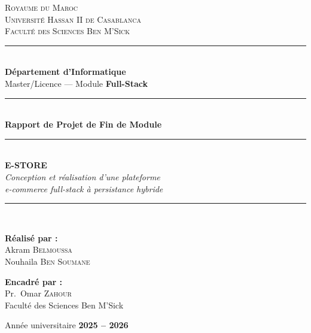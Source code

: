 \documentclass[11pt,a4paper,oneside]{report}
\begin{document}
\begin{titlepage}
  \begin{center}

  \vspace*{1cm}
  {\large\textsc{Royaume du Maroc}}\\[0.2cm]
  {\large\textsc{Université Hassan II de Casablanca}}\\[0.2cm]
  {\large\textsc{Faculté des Sciences Ben M'Sick}}\\[0.6cm]

  \rule{\linewidth}{1pt}\\[0.3cm]
  {\Large \textbf{Département d'Informatique}}\\[0.2cm]
  {\large Master/Licence — Module \textbf{Full-Stack}}\\
  \rule{\linewidth}{1pt}\\[2cm]

  \vfill
  {\Huge\bfseries\color{primaryblue} Rapport de Projet de Fin de Module}\\[1cm]
  \rule[0.5cm]{0.4\linewidth}{0.4pt}\\[0.3cm]
  {\Huge\bfseries\color{darknavy} E-STORE}\\[0.4cm]
  {\LARGE\itshape Conception et réalisation d'une plateforme}\\[0.2cm]
  {\LARGE\itshape e-commerce full-stack à persistance hybride}\\[0.5cm]
  \rule{0.4\linewidth}{0.4pt}\\[2cm]
  \vfill

  \begin{minipage}{0.46\textwidth}
    \begin{flushleft}
      \textbf{\large Réalisé par :}\\[0.2cm]
      Akram \textsc{Belmoussa}\\
      Nouhaila \textsc{Ben Soumane}
    \end{flushleft}
  \end{minipage}
  \hfill
  \begin{minipage}{0.46\textwidth}
    \begin{flushright}
      \textbf{\large Encadré par :}\\[0.2cm]
      Pr.\ Omar \textsc{Zahour}\\
      Faculté des Sciences Ben M'Sick
    \end{flushright}
  \end{minipage}

  \vspace{2cm}
  {\large Année universitaire \textbf{2025 -- 2026}}
  \end{center}
\end{titlepage}
\end{document}
